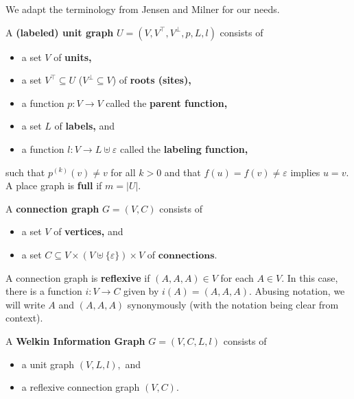 We adapt the terminology from Jensen and Milner \citep{jensen-milner-bigraphs} for our needs.
\begin{definition}
  A \textbf{(labeled) unit graph} $U = (V, V^{\top}, V^{\bot}, p, L, l)$ consists of
  \begin{itemize}
    \item a set $V$ of \textbf{units,}
    \item a set $V^{\top} \subseteq U$ ($V^{\bot} \subseteq V$) of \textbf{roots (sites),}
    \item a function $p: V \to V$ called the \textbf{parent function,}
    \item a set $L$ of \textbf{labels,} and
    \item a function $l: V \to L \uplus \varepsilon$ called the \textbf{labeling function,} %
  \end{itemize}
  such that $p^{(k)}(v) \neq v$ for all $k > 0$ and that $f(u) = f(v) \neq \varepsilon$ implies $u = v.$ A place graph is \textbf{full} if $m = |U|.$ %
\end{definition}

\begin{definition}
  A \textbf{connection graph} $G = (V, C)$ consists of
  \begin{itemize}
    \item a set $V$ of \textbf{vertices,} and
    \item a set $C \subseteq V \times (V \uplus \{\varepsilon\}) \times V$ of $\textbf{connections.}$
  \end{itemize}
        A connection graph is \textbf{reflexive} if $(A, A, A) \in V$ for each $A \in V.$ In this case, there is a function $i: V \to C$ given by $i(A) = (A, A, A).$ Abusing notation, we will write $A$ and $(A, A, A)$ synonymously (with the notation being clear from context).
\end{definition}

\begin{definition} A \textbf{Welkin Information Graph} $G = (V, C, L, l)$ consists of
  \begin{itemize}
    \item a unit graph $(V, L, l),$ and
    \item a reflexive connection graph $(V, C).$
  \end{itemize}
\end{definition}

